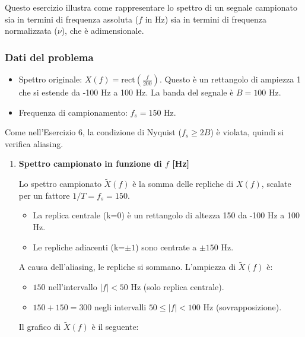 
\begin{soluzione}{16}
    Questo esercizio illustra come rappresentare lo spettro di un segnale campionato sia in termini di frequenza assoluta ($f$ in Hz) sia in termini di frequenza normalizzata ($\nu$), che è adimensionale.

    \subsubsection*{Dati del problema}
    \begin{itemize}
        \item Spettro originale: $X(f) = \text{rect}\left(\frac{f}{200}\right)$. Questo è un rettangolo di ampiezza 1 che si estende da -100 Hz a 100 Hz. La banda del segnale è $B=100$ Hz.
        \item Frequenza di campionamento: $f_s = 150$ Hz.
    \end{itemize}
    Come nell'Esercizio 6, la condizione di Nyquist ($f_s \ge 2B$) è violata, quindi si verifica aliasing.

    \begin{enumerate}
        \item \textbf{Spettro campionato in funzione di $f$ [Hz]}
        
        Lo spettro campionato $\tilde{X}(f)$ è la somma delle repliche di $X(f)$, scalate per un fattore $1/T = f_s = 150$.
        \begin{itemize}
            \item La replica centrale (k=0) è un rettangolo di altezza 150 da -100 Hz a 100 Hz.
            \item Le repliche adiacenti (k=$\pm 1$) sono centrate a $\pm 150$ Hz.
        \end{itemize}
        A causa dell'aliasing, le repliche si sommano. L'ampiezza di $\tilde{X}(f)$ è:
        \begin{itemize}
            \item $150$ nell'intervallo $|f| < 50$ Hz (solo replica centrale).
            \item $150+150 = 300$ negli intervalli $50 \le |f| < 100$ Hz (sovrapposizione).
        \end{itemize}
        Il grafico di $\tilde{X}(f)$ è il seguente:
        

\end{enumerate}
\end{soluzione}
